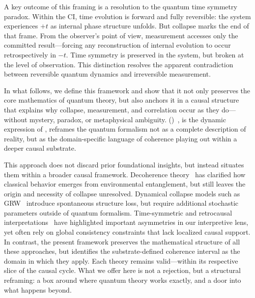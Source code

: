 \documentclass[preprints,article,submit,pdftex,moreauthors]{Definitions/mdpi}
\begin{document}
A key outcome of this framing is a resolution to the quantum time symmetry paradox. Within the CI, time evolution is forward and fully reversible: the system experiences \( +t \) as internal phase structure unfolds. But collapse marks the end of that frame. From the observer’s point of view, measurement accesses only the committed result—forcing any reconstruction of internal evolution to occur retrospectively in \( -t \). Time symmetry is preserved in the system, but broken at the level of observation. This distinction resolves the apparent contradiction between reversible quantum dynamics and irreversible measurement.

In what follows, we define this framework and show that it not only preserves the core mathematics of quantum theory, but also anchors it in a causal structure that explains why collapse, measurement, and correlation occur as they do—without mystery, paradox, or metaphysical ambiguity. \qsd (\qsda)~\cite{bush2025}, is the dynamic expression of \qsdgsta, reframes the quantum formalism not as a complete description of reality, but as the domain-specific language of coherence playing out within a deeper causal substrate.

This approach does not discard prior foundational insights, but instead situates them within a broader causal framework. Decoherence theory~\cite{zurek-decoherence} has clarified how classical behavior emerges from environmental entanglement, but still leaves the origin and necessity of collapse unresolved. Dynamical collapse models such as GRW~\cite{grw-collapse} introduce spontaneous structure loss, but require additional stochastic parameters outside of quantum formalism. Time-symmetric and retrocausal interpretations~\cite{price-retrocausality,aharonov-retro} have highlighted important asymmetries in our interpretive lens, yet often rely on global consistency constraints that lack localized causal support. In contrast, the present framework preserves the mathematical structure of all these approaches, but identifies the substrate-defined coherence interval as the domain in which they apply. Each theory remains valid—within its respective slice of the causal cycle. What we offer here is not a rejection, but a structural reframing: a box around where quantum theory works exactly, and a door into what happens beyond.


\end{document}
